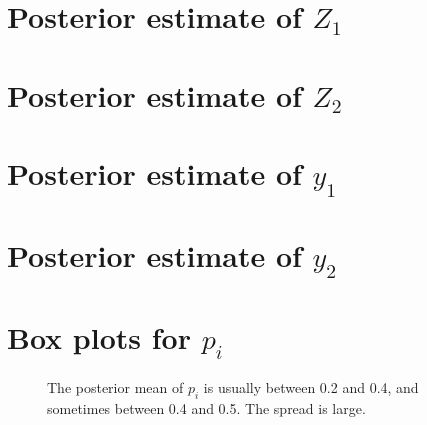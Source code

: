 \documentclass[10pt]{article} %
\begin{document}
\newpage
\section{Posterior estimate of $Z_1$}
\begin{figure}[H]
  \begin{center}  %
  \end{center}
  \caption{}
  \label{fig:z1est}
\end{figure}

\newpage
\section{Posterior estimate of $Z_2$}
\begin{figure}[H]
  \begin{center}  %
  \end{center}
  \caption{}
  \label{fig:z2est}
\end{figure}

\newpage
\section{Posterior estimate of $y_1$}
\begin{figure}[H]
  \begin{center}  %
  \end{center}
  \caption{}
  \label{fig:y1est}
\end{figure}

\newpage
\section{Posterior estimate of $y_2$}
\begin{figure}[H]
  \begin{center}  %
  \end{center}
  \caption{}
  \label{fig:y2est}
\end{figure}

\newpage
\section{Box plots for $p_i$}
\begin{figure}[H]
  \begin{center}  %
  \end{center}
  \caption{The posterior mean of $p_i$ is usually between 0.2 and 0.4, and
  sometimes between 0.4 and 0.5. The spread is large.}
  \label{fig:ppost}
\end{figure}
\end{document}
